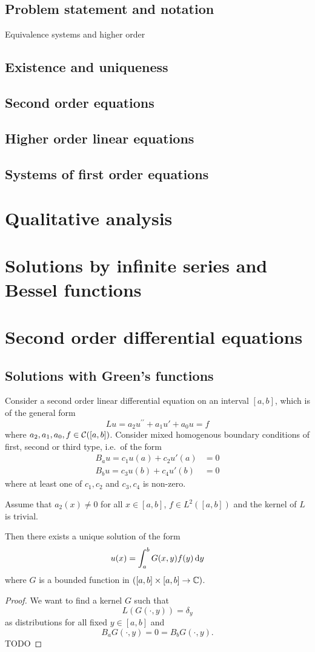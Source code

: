 \subsection{Problem statement and notation}
Equivalence systems and higher order
\subsection{Existence and uniqueness}
\subsection{Second order equations}
\subsection{Higher order linear equations}
\subsection{Systems of first order equations}

\section{Qualitative analysis}

\section{Solutions by infinite series and Bessel functions}

\section{Second order differential equations}
\subsection{Solutions with Green's functions}
\begin{proposition}
Consider a second order linear differential equation on an interval $[a,b]$, which is of the general form
\[ Lu = a_2u^{\prime\prime} + a_1u' + a_0u = f \]
where $a_2,a_1, a_0, f\in \operatorname{\mathcal{C}}([a,b])$.
Consider mixed homogenous boundary conditions of first, second or third type, i.e.\ of the form
\begin{align*}
B_au = c_1 u(a) + c_2 u'(a) &= 0 \\
B_bu = c_3 u(b) + c_4 u'(b) &= 0
\end{align*}
where at least one of $c_1,c_2$ and $c_3,c_4$ is non-zero.

Assume that $a_2(x) \neq 0$ for all $x\in [a,b]$, $f\in L^2([a,b])$ and the kernel of $L$ is trivial.

Then there exists a unique solution of the form
\[ u(x) = \int_{a}^b G(x,y)f(y)\operatorname{d \!}{y} \]
where $G$ is a bounded function in $([a,b]\times [a,b] \to \mathbb{C})$.
\end{proposition}
\begin{proof}
We want to find a kernel $G$ such that
\[ L(G(\cdot, y)) = \delta_y \]
as distributions for all fixed $y\in [a,b]$ and
\[ B_aG(\cdot, y) = 0 = B_bG(\cdot, y). \]
TODO
\end{proof}

